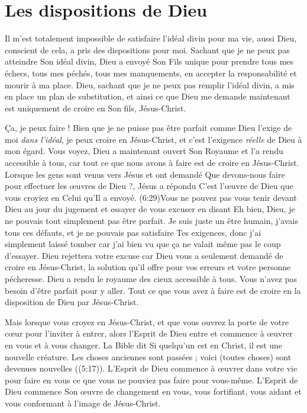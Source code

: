 \section{Les dispositions de Dieu}

Il m'est totalement impossible de satisfaire l'idéal divin
 pour ma vie, aussi Dieu, conscient de cela, a pris
 des dispositions pour moi.
 Sachant que je ne peux pas atteindre Son idéal divin,
 Dieu a envoyé Son Fils unique pour prendre tous mes échecs,
 tous mes péchés, tous mes manquements, en accepter la responsabilité
 et mourir à ma place.
 Dieu, sachant que je ne peux pas remplir l'idéal divin,
 a mis en place un plan de substitution, et ainsi ce que Dieu
 me demande maintenant est uniquement de croire en Son fils, Jésus-Christ.

Ça, je peux faire !
 Bien que je ne puisse pas être parfait
 comme Dieu l'exige de moi \emph{dans l'idéal},
 je peux croire en Jésus-Christ,
 et c'est l'exigence \emph{réelle} de Dieu à mon égard.
 Vous voyez, Dieu a maintenant ouvert Son Royaume et l'a rendu
 accessible à tous, car tout ce que nous avons à faire
 est de croire en Jésus-Christ.
 Lorsque les gens sont venus vers Jésus et ont demandé\frcolon{}
 \Og Que devons-nous faire pour effectuer les œuvres de Dieu ?\Fg{},
 Jésus a répondu\frcolon{}
 \Og C'est l'œuvre de Dieu que vous croyiez en Celui qu'Il a envoyé. \Fg{}
 (6:29)Vous ne pouvez pas vous tenir devant Dieu au jour du jugement
 et essayer de vous excuser en disant\frcolon{}
 \Og Eh bien, Dieu, je ne pouvais tout simplement pas être parfait.
 Je suis juste un être humain, j'avais tous ces défauts,
 et je ne pouvais pas satisfaire Tes exigences,
 donc j'ai simplement laissé tomber car j'ai bien vu
 que ça ne valait même pas le coup d'essayer. \Fg{}
 Dieu rejettera votre excuse car Dieu vous a seulement demandé
 de croire en Jésus-Christ, la solution qu'il offre pour vos erreurs
 et votre personne pécheresse.
 Dieu a rendu le royaume des cieux accessible à tous.
 Vous n'avez pas besoin d'être parfait pour y aller.
 Tout ce que vous avez à faire est de croire en la disposition
 de Dieu par Jésus-Christ.

Mais lorsque vous croyez en Jésus-Christ,
 et que vous ouvrez la porte de votre cœur
 pour l'inviter à entrer,
 alors l'Esprit de Dieu entre et commence à œuvrer en vous
 et à vous changer.
 La Bible dit\frcolon{}
 \Og Si quelqu'un est en Christ, il est une nouvelle créature.
 Les choses anciennes sont passées ; voici\frcolon{} (toutes choses)
 sont devenues nouvelles \Fg{} ((5:17)).
 L'Esprit de Dieu commence à œuvrer dans votre vie pour faire
 en vous ce que vous ne pouviez pas faire pour vous-même.
 L'Esprit de Dieu commence Son œuvre de changement en vous,
 vous fortifiant, vous aidant et vous conformant à l'image de Jésus-Christ.


